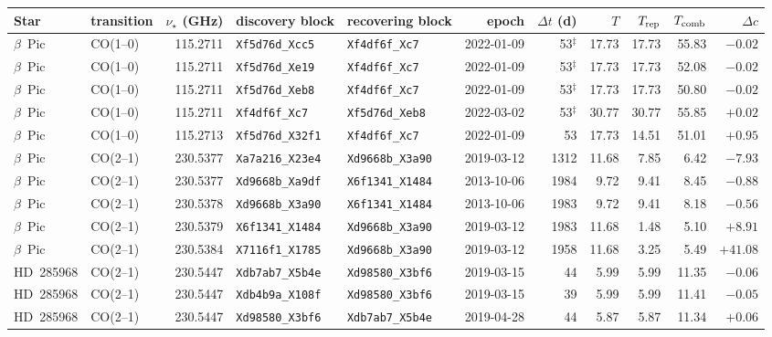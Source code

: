 \begin{tabular}{@{}llrllrrrrrr@{}}
\hline
Star & transition & $\nu_\star$ (GHz) & discovery block & recovering block & epoch & $\Delta t$ (d) & $T$ & $T_{\rm rep}$ & $T_{\rm comb}$ & $\Delta c$ \\
\hline
$\beta$~Pic & CO(1--0) & 115.2711 & \texttt{Xf5d76d\_Xcc5} & \texttt{Xf4df6f\_Xc7} & 2022-01-09 & 53$^\ddagger$ & 17.73 & 17.73 & 55.83 & $-0.02$ \\
$\beta$~Pic & CO(1--0) & 115.2711 & \texttt{Xf5d76d\_Xe19} & \texttt{Xf4df6f\_Xc7} & 2022-01-09 & 53$^\ddagger$ & 17.73 & 17.73 & 52.08 & $-0.02$ \\
$\beta$~Pic & CO(1--0) & 115.2711 & \texttt{Xf5d76d\_Xeb8} & \texttt{Xf4df6f\_Xc7} & 2022-01-09 & 53$^\ddagger$ & 17.73 & 17.73 & 50.80 & $-0.02$ \\
$\beta$~Pic & CO(1--0) & 115.2711 & \texttt{Xf4df6f\_Xc7} & \texttt{Xf5d76d\_Xeb8} & 2022-03-02 & 53$^\ddagger$ & 30.77 & 30.77 & 55.85 & $+0.02$ \\
$\beta$~Pic & CO(1--0) & 115.2713 & \texttt{Xf5d76d\_X32f1} & \texttt{Xf4df6f\_Xc7} & 2022-01-09 & 53 & 17.73 & 14.51 & 51.01 & $+0.95$ \\
$\beta$~Pic & CO(2--1) & 230.5377 & \texttt{Xa7a216\_X23e4} & \texttt{Xd9668b\_X3a90} & 2019-03-12 & 1312 & 11.68 & 7.85 & 6.42 & $-7.93$ \\
$\beta$~Pic & CO(2--1) & 230.5377 & \texttt{Xd9668b\_Xa9df} & \texttt{X6f1341\_X1484} & 2013-10-06 & 1984 & 9.72 & 9.41 & 8.45 & $-0.88$ \\
$\beta$~Pic & CO(2--1) & 230.5378 & \texttt{Xd9668b\_X3a90} & \texttt{X6f1341\_X1484} & 2013-10-06 & 1983 & 9.72 & 9.41 & 8.18 & $-0.56$ \\
$\beta$~Pic & CO(2--1) & 230.5379 & \texttt{X6f1341\_X1484} & \texttt{Xd9668b\_X3a90} & 2019-03-12 & 1983 & 11.68 & 1.48 & 5.10 & $+8.91$ \\
$\beta$~Pic & CO(2--1) & 230.5384 & \texttt{X7116f1\_X1785} & \texttt{Xd9668b\_X3a90} & 2019-03-12 & 1958 & 11.68 & 3.25 & 5.49 & $+41.08$ \\
HD~285968 & CO(2--1) & 230.5447 & \texttt{Xdb7ab7\_X5b4e} & \texttt{Xd98580\_X3bf6} & 2019-03-15 & 44 & 5.99 & 5.99 & 11.35 & $-0.06$ \\
HD~285968 & CO(2--1) & 230.5447 & \texttt{Xdb4b9a\_X108f} & \texttt{Xd98580\_X3bf6} & 2019-03-15 & 39 & 5.99 & 5.99 & 11.41 & $-0.05$ \\
HD~285968 & CO(2--1) & 230.5447 & \texttt{Xd98580\_X3bf6} & \texttt{Xdb7ab7\_X5b4e} & 2019-04-28 & 44 & 5.87 & 5.87 & 11.34 & $+0.06$ \\
\hline
\end{tabular}

